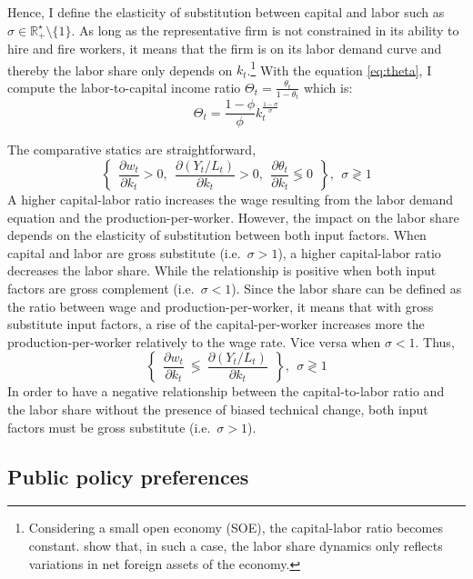 \documentclass[
]{article}
\begin{document}
Hence, I define the elasticity of substitution between capital and labor such as \(\sigma\in\mathbb{R}_+^\star\setminus\lbrace1\rbrace\).
As long as the representative firm is not constrained in its ability to hire and fire workers, it means that the firm is on its labor demand curve and thereby the labor share only depends on \(k_t\).\footnote{Considering a small open economy (SOE), the capital-labor ratio becomes constant. \citet{Schmidt2013} show that, in such a case, the labor share dynamics only reflects variations in net foreign assets of the economy.}
With the equation \eqref{eq:theta}, I compute the labor-to-capital income ratio \(\Theta_t = \frac{\theta_t}{1-\theta_t}\) which is:
\begin{equation}
    \Theta_t = \frac{1-\phi}{\phi}k_t^{\frac{1-\sigma}{\sigma}} \label{eq:Theta}
\end{equation}

The comparative statics are straightforward,
\begin{equation*}
    \left\lbrace ~~
    \frac{\partial w_t}{\partial k_t} > 0,~~
    \frac{\partial (Y_t/L_t)}{\partial k_t} > 0,~~
    \frac{\partial \theta_t}{\partial k_t} \lessgtr 0 ~~
    \right\rbrace, ~~ \sigma \gtrless 1
\end{equation*}
A higher capital-labor ratio increases the wage resulting from the labor demand equation and the production-per-worker. However, the impact on the labor share depends on the elasticity of substitution between both input factors. When capital and labor are gross substitute (i.e.~\(\sigma > 1\)), a higher capital-labor ratio decreases the labor share. While the relationship is positive when both input factors are gross complement (i.e.~\(\sigma < 1\)). Since the labor share can be defined as the ratio between wage and production-per-worker, it means that with gross substitute input factors, a rise of the capital-per-worker increases more the production-per-worker relatively to the wage rate. Vice versa when \(\sigma <1\). Thus,
\begin{equation*}
    \left\lbrace ~~
    \frac{\partial w_t}{\partial k_t} ~\lessgtr~ \frac{\partial (Y_t/L_t)}{\partial k_t} ~~
    \right\rbrace, ~~ \sigma \gtrless 1
\end{equation*}
In order to have a negative relationship between the capital-to-labor ratio and the labor share without the presence of biased technical change, both input factors must be gross substitute (i.e.~\(\sigma >1\)).

\hypertarget{public-policy-preferences}{%
\subsection{Public policy preferences}\label{public-policy-preferences}}
\end{document}
